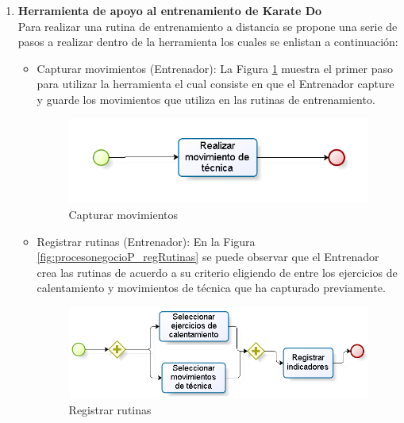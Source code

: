 \begin{enumerate}
	\item \textbf{Herramienta de apoyo al entrenamiento de Karate Do}\\
	Para realizar una rutina de entrenamiento a distancia se propone una serie de pasos a realizar dentro de la herramienta los cuales se enlistan a continuación:
	\begin{itemize}
		\item Capturar movimientos (Entrenador): La Figura \ref{fig:procesonegocioP_captEjer}  muestra el primer paso para utilizar la herramienta el cual consiste en que el Entrenador capture y guarde los movimientos que utiliza en las rutinas de entrenamiento.
			\begin{figure}[H]
				\begin{center}
					\includegraphics[scale=0.7]{./Figuras/Negocio/Capturar_ejercicios_o_movimientos}
				\end{center}
				\caption{Capturar movimientos}
				\label{fig:procesonegocioP_captEjer}
			\end{figure}
		\item Registrar rutinas (Entrenador): En la Figura \ref{fig:procesonegocioP_regRutinas}  se puede observar que el Entrenador crea las rutinas de acuerdo a su criterio eligiendo de entre los ejercicios de calentamiento y movimientos de técnica que ha capturado previamente.
			\begin{figure}[H]
				\begin{center}
					\includegraphics[scale=0.7]{./Figuras/Negocio/Registrar_rutinas}
				\end{center}
				\caption{Registrar rutinas}

\end{figure}
\end{itemize}
\end{enumerate}
